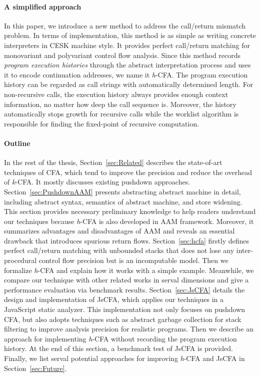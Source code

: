 \documentclass{article}
\begin{document}
\paragraph{A simplified approach}
In this paper, we introduce a new method to address the call/return mismatch problem.
In terms of implementation, this method is as simple as writing concrete interpreters in CESK machine style.
It provides perfect call/return matching for monovariant and polyvariant control flow analysis.
Since this method records \emph{program execution histories} through the abstract interpretation process and uses it to encode continuation addresses, we name it \textit{h}-CFA\@.
The program execution history can be regarded as call strings with automatically determined length.
For non-recursive calls, the execution history always provides enough context information, no matter how deep the call sequence is.
Moreover, the history automatically stops growth for recursive calls while the worklist algorithm is responsible
for finding the fixed-point of recursive computation.

\paragraph{Outline}
In the rest of the thesis,
Section~\ref{sec:Related} describes the state-of-art techniques of CFA, which tend to improve the precision and reduce the overhead of \textit{k}-CFA\@. It mostly discusses existing pushdown approaches.
Section~\ref{sec:PushdownAAM} presents abstracting abstract machine in detail, including abstract syntax, semantics of abstract machine,
and store widening.
This section provides necessary preliminary knowledge to help readers understand our techniques because \textit{h}-CFA is also developed in AAM framework.
Moreover, it summarizes advantages and disadvantages of AAM and reveals an essential drawback that introduces spurious return flows.
Section~\ref{sec:hcfa} firstly defines perfect call/return matching with unbounded stacks that does not lose any inter-procedural control flow precision but is an incomputable model.
Then we formalize \textit{h}-CFA and explain how it works with a simple example.
Meanwhile, we compare our technique with other related works in serval dimensions and give a performance evaluation via benchmark results.
Section~\ref{sec:JsCFA} details the design and implementation of JsCFA, which applies our techniques in a JavaScript static analyzer.
This implementation not only focuses on pushdown CFA, but also adopts techniques
such as abstract garbage collection for stack filtering to improve analysis precision for realistic programs.
Then we describe an approach for implementing \textit{h}-CFA without recording the program execution history.
At the end of this section, a benchmark test of JsCFA is provided.
Finally, we list serval potential approaches for improving \textit{h}-CFA and JsCFA in Section~\ref{sec:Future}.
\end{document}
